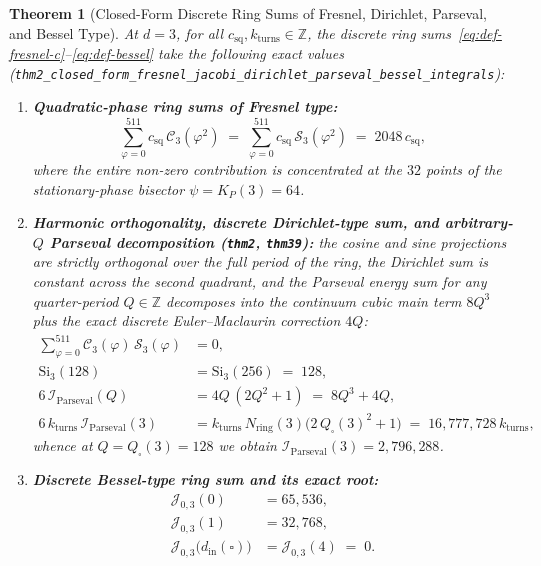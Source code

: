 \documentclass[11pt,a4paper]{article}
\theoremstyle{plain}
\newtheorem{theorem}{Theorem}[section]
\theoremstyle{definition}
\begin{document}
\begin{theorem}[Closed-Form Discrete Ring Sums of Fresnel, Dirichlet, Parseval, and Bessel Type]
\label{thm:main-2b}
At $d = 3$, for all $c_{\mathrm{sq}}, k_{\mathrm{turns}} \in \mathbb{Z}$, the discrete ring sums~\eqref{eq:def-fresnel-c}--\eqref{eq:def-bessel} take the following exact values (\texttt{thm2\_closed\_form\_fresnel\_jacobi\_dirichlet\_parseval\_bessel\_integrals}):
\begin{enumerate}[label=\textbf{(\roman*)},leftmargin=*]
\item \textbf{Quadratic-phase ring sums of Fresnel type:}
  \begin{equation}
    \label{eq:fresnel-closed}
    \sum_{\varphi=0}^{511} c_{\mathrm{sq}}\,\mathcal{C}_3(\varphi^2) \;=\; \sum_{\varphi=0}^{511} c_{\mathrm{sq}}\,\mathcal{S}_3(\varphi^2) \;=\; 2048\,c_{\mathrm{sq}},
  \end{equation}
  where the entire non-zero contribution is concentrated at the $32$ points of the stationary-phase bisector $\psi = K_P(3) = 64$.
\item \textbf{Harmonic orthogonality, discrete Dirichlet-type sum, and arbitrary-$Q$ Parseval decomposition (\texttt{thm2}, \texttt{thm39}):}
  the cosine and sine projections are strictly orthogonal over the full period of the ring, the Dirichlet sum is constant across the second quadrant, and the Parseval energy sum for any quarter-period $Q \in \mathbb{Z}$ decomposes into the continuum cubic main term $8Q^3$ plus the exact discrete Euler--Maclaurin correction $4Q$:
  \begin{align}
    \sum_{\varphi=0}^{511} \mathcal{C}_3(\varphi)\,\mathcal{S}_3(\varphi) &= 0, \label{eq:ortho-cs-zero} \\
    \mathrm{Si}_3(128) &= \mathrm{Si}_3(256) \;=\; 128, \label{eq:dirichlet-closed} \\
    6\,\mathcal{I}_{\mathrm{Parseval}}(Q) &= 4Q\,(2Q^2 + 1) \;=\; 8Q^3 + 4Q, \label{eq:parseval-general-q} \\
    6\,k_{\mathrm{turns}}\,\mathcal{I}_{\mathrm{Parseval}}(3) &= k_{\mathrm{turns}}\,N_{\mathrm{ring}}(3)\bigl(2\,Q_\square(3)^2 + 1\bigr) \;=\; 16,777,728\,k_{\mathrm{turns}}, \label{eq:parseval-closed}
  \end{align}
  whence at $Q = Q_\square(3) = 128$ we obtain $\mathcal{I}_{\mathrm{Parseval}}(3) = 2,796,288$.
\item \textbf{Discrete Bessel-type ring sum and its exact root:}
  \begin{align}
    \mathcal{J}_{0,3}(0) &= 65,536, \label{eq:bessel-k0} \\
    \mathcal{J}_{0,3}(1) &= 32,768, \label{eq:bessel-k1} \\
    \mathcal{J}_{0,3}\bigl(d_{\mathrm{in}}(\square)\bigr) &= \mathcal{J}_{0,3}(4) \;=\; 0. \label{eq:bessel-k4}
  \end{align}
\end{enumerate}
\end{theorem}
\end{document}
